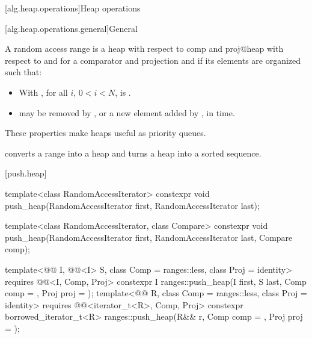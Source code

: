 [alg.heap.operations]{Heap operations}

[alg.heap.operations.general]{General}

\pnum
A random access range  is a
{heap with respect to comp and proj@heap with respect to  and }
for a comparator and projection  and 
if its elements are organized such that:

\begin{itemize}
\item
  With , for all $i$, $0 < i < N$,
  is .
\item
   may be removed by , or
  a new element added by ,
  in  time.
\end{itemize}

\pnum
These properties make heaps useful as priority queues.

\pnum
{} converts a range into a heap and
 turns a heap into a sorted sequence.

[push.heap]{}

%
\begin{itemdecl}
template<class RandomAccessIterator>
  constexpr void push_heap(RandomAccessIterator first, RandomAccessIterator last);

template<class RandomAccessIterator, class Compare>
  constexpr void push_heap(RandomAccessIterator first, RandomAccessIterator last,
                           Compare comp);

template<@@ I, @@<I> S, class Comp = ranges::less,
         class Proj = identity>
  requires @@<I, Comp, Proj>
  constexpr I
    ranges::push_heap(I first, S last, Comp comp = {}, Proj proj = {});
template<@@ R, class Comp = ranges::less, class Proj = identity>
  requires @@<iterator_t<R>, Comp, Proj>
  constexpr borrowed_iterator_t<R>
    ranges::push_heap(R&& r, Comp comp = {}, Proj proj = {});
\end{itemdecl}

